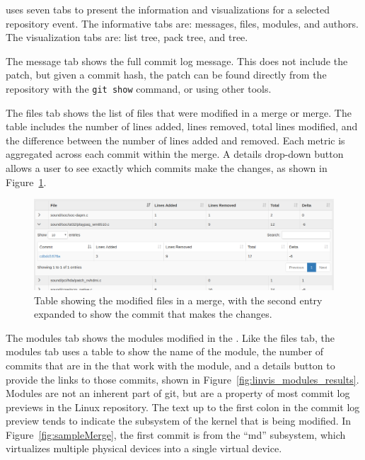 \tool{} uses seven tabs to present the information and visualizations
for a selected repository event.
The informative tabs are: messages, files, modules, and authors.
The visualization tabs are: list tree, pack tree, and \rt{} tree.

The message tab shows the full commit log message. This does not include
the patch, but given a commit hash, the patch can be found directly from
the repository with the \verb|git show| command, or using other tools.

The files tab shows the list of files that were modified in a merge or
merge.
The table includes the number of lines added, lines removed, total lines
modified, and the difference between the number of lines added and
removed.
Each metric is aggregated across each commit within the merge.
A details drop-down button allows a user to see exactly which commits
make the changes, as shown in Figure~\ref{fig:linvis_files_results}.

\begin{figure}[htpb]
  \centering
  \includegraphics[width=0.9\linewidth]{Figures/Linvis/linvis_files.png}
  \caption{Table showing the modified files in a merge, with the second
    entry expanded to show the commit that makes the changes.}
  \label{fig:linvis_files_results}
\end{figure}

The modules tab shows the modules modified in the \mt{}. Like the files
tab, the modules tab uses a table to show the name of the module, the
number of commits that are in the \mt{} that work with the module, and a
details button to provide the links to those commits, shown in
Figure~\ref{fig:linvis_modules_results}. Modules are not an inherent
part of git, but are a property of most commit log previews in the Linux
repository. The text up to the first colon in the commit log preview
tends to indicate the subsystem of the kernel that is being modified. In
Figure~\ref{fig:sampleMerge}, the first commit is from the ``md''
subsystem, which virtualizes multiple physical devices into a single
virtual device.

